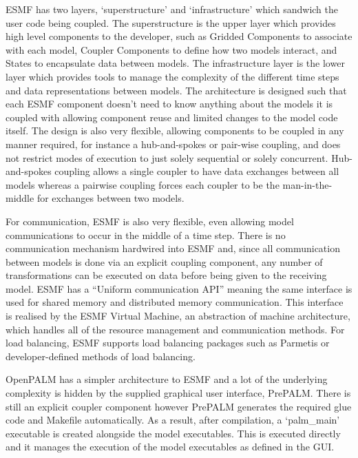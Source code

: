 ESMF has two layers, `superstructure' and `infrastructure' which sandwich the
user code being coupled. The superstructure is the upper layer which provides
high level components to the developer, such as Gridded Components to associate
with each model, Coupler Components to define how two models interact, and
States to encapsulate data between models. The infrastructure layer is the lower
layer which provides tools to manage the complexity of the different time steps
and data representations between models. The architecture is designed such that
each ESMF component doesn't need to know anything about the models it is coupled
with allowing component reuse and limited changes to the model code itself. The
design is also very flexible, allowing components to be coupled in any manner
required, for instance a hub-and-spokes or pair-wise coupling, and does not
restrict modes of execution to just solely sequential or solely concurrent.
Hub-and-spokes coupling allows a single coupler to have data exchanges between
all models whereas a pairwise coupling forces each coupler to be the
man-in-the-middle for exchanges between two models. 

For communication, ESMF is also very flexible, even allowing model
communications to occur in the middle of a time step. There is no communication
mechanism hardwired into ESMF and, since all communication between models is
done via an explicit coupling component, any number of transformations can be
executed on data before being given to the receiving model. ESMF has a ``Uniform
communication API'' \cite{ESMF2014} meaning the same interface is used for
shared memory and distributed memory communication. This interface is realised
by the ESMF Virtual Machine, an abstraction of machine architecture, which
handles all of the resource management and communication methods. For load
balancing, ESMF supports load balancing packages such as Parmetis
\cite{Hoefler2010,Karypis1998} or developer-defined methods of load balancing.

OpenPALM has a simpler architecture to ESMF and a lot of the underlying
complexity is hidden by the supplied graphical user interface, PrePALM. There is
still an explicit coupler component however PrePALM generates the required glue
code and Makefile automatically. As a result, after compilation, a `palm\_main'
executable is created alongside the model executables. This is executed directly
and it manages the execution of the model executables as defined in the GUI.

